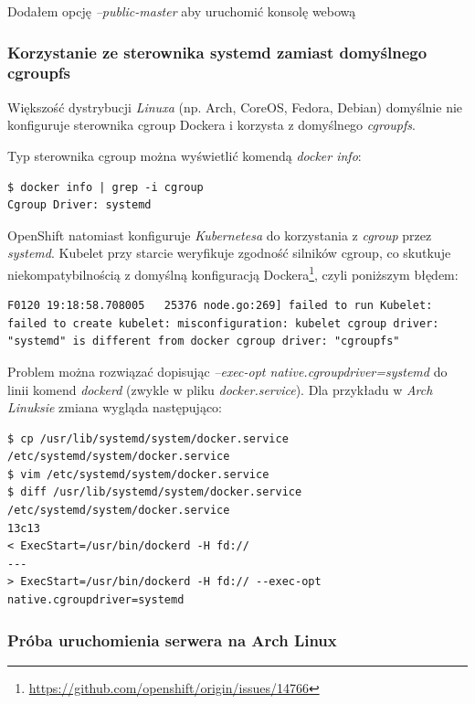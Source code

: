 \documentclass[a4paper,12pt,twoside,openany]{report}
\DeclareRobustCommand{\href}[2]{#2\footnote{\url{#1}}}
\begin{document}
Dodałem opcję \emph{--public-master} aby uruchomić konsolę webową

\hypertarget{korzystanie-ze-sterownika-systemd-zamiast-domyux15blnego-cgroupfs}{%
\subsubsection{Korzystanie ze sterownika systemd zamiast domyślnego
cgroupfs}\label{korzystanie-ze-sterownika-systemd-zamiast-domyux15blnego-cgroupfs}}

Większość dystrybucji \emph{Linuxa} (np. Arch, CoreOS, Fedora, Debian)
domyślnie nie konfiguruje sterownika cgroup Dockera i korzysta z
domyślnego \emph{cgroupfs}.

Typ sterownika cgroup można wyświetlić komendą \emph{docker info}:

\begin{lstlisting}
$ docker info | grep -i cgroup
Cgroup Driver: systemd
\end{lstlisting}

OpenShift natomiast konfiguruje \emph{Kubernetesa} do korzystania z
\emph{cgroup} przez \emph{systemd}. Kubelet przy starcie weryfikuje
zgodność silników cgroup, co
\href{https://github.com/openshift/origin/issues/14766}{skutkuje
niekompatybilnością z domyślną konfiguracją Dockera}, czyli poniższym
błędem:

\begin{lstlisting}
F0120 19:18:58.708005   25376 node.go:269] failed to run Kubelet: failed to create kubelet: misconfiguration: kubelet cgroup driver: "systemd" is different from docker cgroup driver: "cgroupfs"
\end{lstlisting}

Problem można rozwiązać dopisując \emph{--exec-opt
native.cgroupdriver=systemd} do linii komend \emph{dockerd} (zwykle w
pliku \emph{docker.service}). Dla przykładu w \emph{Arch Linuksie}
zmiana wygląda następująco:

\begin{lstlisting}
$ cp /usr/lib/systemd/system/docker.service /etc/systemd/system/docker.service
$ vim /etc/systemd/system/docker.service
$ diff /usr/lib/systemd/system/docker.service /etc/systemd/system/docker.service
13c13
< ExecStart=/usr/bin/dockerd -H fd://
---
> ExecStart=/usr/bin/dockerd -H fd:// --exec-opt native.cgroupdriver=systemd
\end{lstlisting}

\hypertarget{pruxf3ba-uruchomienia-serwera-na-arch-linux}{%
\subsubsection{Próba uruchomienia serwera na Arch
Linux}\label{pruxf3ba-uruchomienia-serwera-na-arch-linux}}
\end{document}
